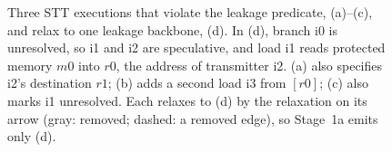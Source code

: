 \begin{figure}[t]
{%
}%
\caption{Three STT executions that violate the leakage predicate, (a)--(c), and relax to one leakage backbone, (d). In (d), branch i0 is unresolved, so i1 and i2 are speculative, and load i1 reads protected memory $m0$ into $r0$, the address of transmitter i2. (a) also specifies i2's destination $r1$; (b) adds a second load i3 from $[r0]$; (c) also marks i1 unresolved. Each relaxes to (d) by the relaxation on its arrow (gray: removed; dashed: a removed edge), so Stage~1a emits only (d).}
\label{fig:relaxation}\label{fig:four-panes}
\end{figure}
